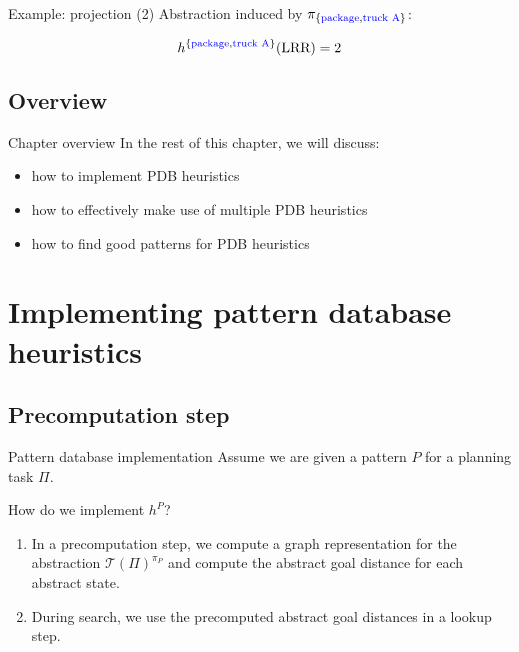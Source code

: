 \documentclass{gkibeamer}
\begin{document}
\begin{frame}{Example: projection (2)}
  Abstraction induced by $\pi_{\{\text{{\color{blue} package}},
    \text{{\color{blue} truck A}}\}}$:
  \begin{center}
    \picprojectionpackagetruck
  \end{center}
  \[ h^{\{\text{{\color{blue} package}},
        \text{{\color{blue} truck A}}\}}(\text{LRR}) = 2 \]
\end{frame}

\subsection{Overview}

\begin{frame}{Chapter overview}
  In the rest of this chapter, we will discuss:
  \begin{itemize}
  \item how to \alert{implement} PDB heuristics
  \item how to effectively make use of \alert{multiple} PDB heuristics
  \item how to \alert{find good patterns} for PDB heuristics
  \end{itemize}
\end{frame}

\section[Implementing PDBs]{Implementing pattern database heuristics}
\subsection[Precomputation]{Precomputation step}

\begin{frame}{Pattern database implementation}
  Assume we are given a pattern $P$ for a planning task $\Pi$.

  How do we implement $h^P$?

  \begin{enumerate}
  \item In a \alert{precomputation} step, we compute a graph
    representation for the abstraction $\mathcal T(\Pi)^{\pi_P}$ and
    compute the abstract goal distance for each abstract state.
  \item During search, we use the precomputed abstract goal distances
    in a \alert{lookup} step.
  \end{enumerate}
\end{frame}
\end{document}
